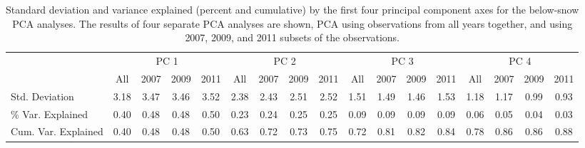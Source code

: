 
\setcounter{table}{0}

\makeatletter 
\renewcommand{\thetable}{A.\@arabic\c@table}
\makeatother

\begin{sidewaystable}

\centering

\caption{Standard deviation and variance explained (percent and cumulative) by the first four principal component axes for the below-snow PCA analyses. The results of four separate PCA analyses are shown, PCA using observations from all years together, and using 2007, 2009, and 2011 subsets of the observations.\label{winter_eigen_t}}

\begin{tabular}{lcccccccccccccccc}
\toprule
{} & \multicolumn{4}{c}{PC 1}& \multicolumn{4}{c}{PC 2}& \multicolumn{4}{c}{PC 3}& \multicolumn{4}{c}{PC 4}\\

\cmidrule(l){2-5} \cmidrule(l){6-9} \cmidrule(l){10-13} \cmidrule(l){14-17}
{} &All	&2007 &2009 &2011 &All &2007 &2009 &2011 &All &2007 &2009 &2011& All &2007 &2009 &2011\\
\midrule
Std. Deviation	&3.18	&3.47	&3.46	&3.52	&2.38	&2.43	&2.51	&2.52	&1.51	&1.49	&1.46	&1.53	&1.18	&1.17	&0.99	&0.93\\
\% Var. Explained	&0.40	&0.48	&0.48	&0.50	&0.23	&0.24	&0.25	&0.25	&0.09	&0.09	&0.09	&0.09	&0.06	&0.05	&0.04	&0.03\\
Cum. Var. Explained	&0.40	&0.48	&0.48	&0.50	&0.63	&0.72	&0.73	&0.75	&0.72	&0.81	&0.82	&0.84	&0.78	&0.86	&0.86	&0.88\\
\bottomrule
\end{tabular}

\end{sidewaystable}
